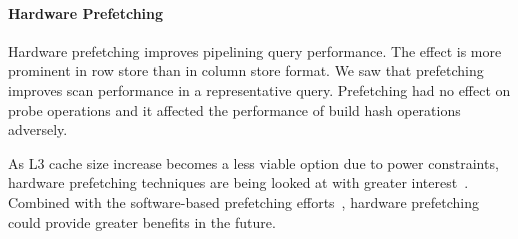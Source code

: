 \paragraph*{\textbf{Hardware Prefetching}}
Hardware prefetching improves pipelining query performance.
The effect is more prominent in row store than in column store format. 
We saw that prefetching improves scan performance in a representative query.
Prefetching had no effect on probe operations and it affected the performance of build hash operations adversely. 

As L3 cache size increase becomes a less viable option due to power constraints, hardware prefetching techniques are being looked at with greater interest~\cite{DBLP:journals/csur/Mittal16c}. 
Combined with the software-based prefetching efforts~\cite{DBLP:conf/icde/ChenAGM04, rof}, hardware prefetching could provide greater benefits in the future. 